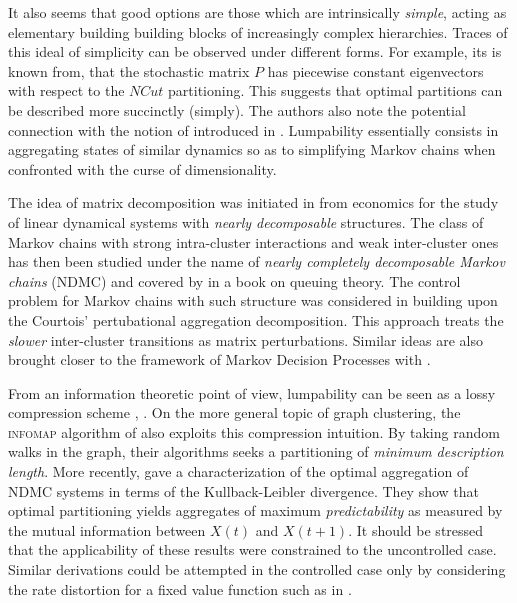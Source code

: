 \documentclass[12pt, oneside, extrafontsizes]{memoir}  %
\newcommand{\mdps}{Markov Decision Processes\xspace}
\newcommand{\termidx}[1]{\index{#1}{\textbf{#1}}}
\theoremstyle{plain}
\theoremstyle{definition}
\begin{document}
It also seems that good options are those which are intrinsically \textit{simple}, acting as
elementary building building blocks of increasingly complex hierarchies. Traces of this
ideal of simplicity can be observed under different forms. For example, its is
known from\cite{Shi2001}, that the stochastic matrix $P$ has piecewise constant
eigenvectors with respect to the $NCut$ partitioning. This suggests that optimal
partitions can be described more succinctly (simply). The authors also note the
potential connection with the notion of \termidx{lumpability} introduced in
\cite{Kemeny1976}. Lumpability essentially consists in aggregating states of similar
dynamics so as to simplifying Markov chains when confronted with the curse of
dimensionality. 

The idea of matrix decomposition was initiated in \cite{AndoFisher1963} from
economics for the study of linear dynamical systems with \textit{nearly decomposable}
structures. The class of Markov chains with strong intra-cluster interactions and weak
inter-cluster ones has then been studied under the name of \textit{nearly completely
decomposable Markov chains} (NDMC) \cite{Gaitsgori1975} and covered by
\cite{Courtois1977} in a book on queuing theory. The control problem for Markov chains
with such structure was considered in \cite{Teneketzis1980, Delebecque1981,
Phillips1981, Coderch1983} building upon the Courtois' pertubational aggregation
decomposition. This approach treats the \textit{slower} inter-cluster transitions as
matrix perturbations. Similar ideas are also brought closer to the framework of \mdps
with \cite{Haviv1985, Aldhaheri1991, Zhang1997}. 

From an information theoretic point of view, lumpability can be seen as a lossy
compression scheme \cite{Lindqvist1978}, \cite{Watanabe1960}. On the more general
topic of graph clustering, the  \textsc{infomap} algorithm of \cite{Rosvall2008} also
exploits this compression intuition. By taking random walks in the graph, their
algorithms seeks a partitioning of \textit{minimum description length}. More recently,
\cite{Deng2011} gave a characterization of the optimal aggregation of NDMC systems in
terms of the Kullback-Leibler divergence. They show that optimal partitioning yields
aggregates of maximum \textit{predictability} as measured by the mutual information
between $X(t)$ and $X(t+1)$. It should be stressed that the applicability of these results
were constrained to the uncontrolled case. Similar derivations could be attempted in the
controlled case only by considering the rate distortion for a fixed value function such as
in \cite{Still2012}.
\end{document}
